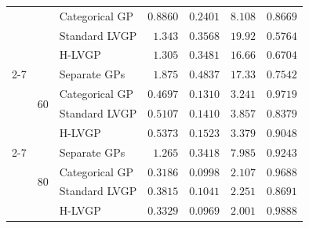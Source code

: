 \begin{table}[htbp]
\begin{tabular}{lllrrrr}
 &  & Categorical GP & \colorbox{green!20}{\boldmath$0.8860$} & \colorbox{green!20}{\boldmath$0.2401$} & \colorbox{green!20}{\boldmath$8.108$} & \colorbox{green!20}{\boldmath$0.8669$} \\
 &  & Standard LVGP & $1.343$ & $0.3568$ & $19.92$ & $0.5764$ \\
 &  & H-LVGP & $1.305$ & $0.3481$ & $16.66$ & $0.6704$ \\
\cmidrule(lr){2-7}
 & \multirow{4}{*}{60} & Separate GPs & $1.875$ & $0.4837$ & $17.33$ & $0.7542$ \\
 &  & Categorical GP & \colorbox{green!20}{\boldmath$0.4697$} & \colorbox{green!20}{\boldmath$0.1310$} & \colorbox{green!20}{\boldmath$3.241$} & \colorbox{green!20}{\boldmath$0.9719$} \\
 &  & Standard LVGP & $0.5107$ & $0.1410$ & $3.857$ & $0.8379$ \\
 &  & H-LVGP & $0.5373$ & $0.1523$ & $3.379$ & $0.9048$ \\
\cmidrule(lr){2-7}
 & \multirow{4}{*}{80} & Separate GPs & $1.265$ & $0.3418$ & $7.985$ & $0.9243$ \\
 &  & Categorical GP & \colorbox{green!20}{\boldmath$0.3186$} & $0.0998$ & $2.107$ & \colorbox{green!20}{\boldmath$0.9688$} \\
 &  & Standard LVGP & $0.3815$ & $0.1041$ & $2.251$ & $0.8691$ \\
 &  & H-LVGP & $0.3329$ & \colorbox{green!20}{\boldmath$0.0969$} & \colorbox{green!20}{\boldmath$2.001$} & $0.9888$ \\
\bottomrule
\end{tabular}
\end{table}
